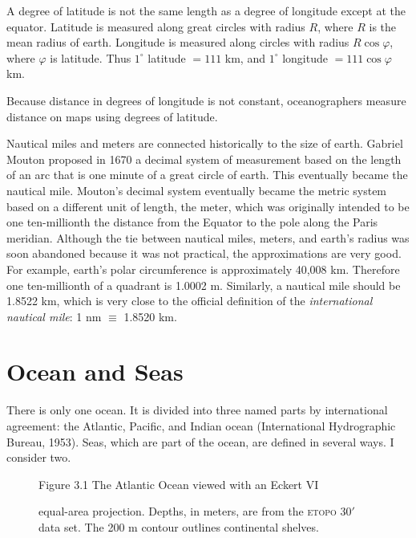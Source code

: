 A degree of latitude is not the same length as a degree of longitude except
at the equator. Latitude is measured along great circles with radius $R$, where
$R$ is the mean radius of earth. Longitude is measured along circles with
radius $R \cos \varphi$, where
$\varphi$ is latitude. Thus $1^{\circ}$ latitude $ = 111$ km, and $1^{\circ}$
longitude $= 111 \cos \varphi$ km.

Because distance in degrees of longitude is not constant, oceanographers measure
distance on maps using degrees of latitude.

Nautical miles and meters are connected historically to the size of earth. Gabriel Mouton proposed in 1670
a decimal system of measurement based on the length of an arc that is one minute of a great circle of
earth.  This eventually became the nautical mile. Mouton's decimal system eventually became the metric
system based on a different unit of length, the meter, which was originally intended to be one
ten-millionth the distance from the Equator to the pole along the Paris meridian. Although the
tie between nautical miles, meters, and earth's radius was soon abandoned because it was not
practical, the approximations are very good. For example, earth's polar circumference
is approximately 40,008 km. Therefore one ten-millionth of a quadrant is 1.0002
m. Similarly, a nautical mile should be 1.8522 km, which is
very close to the official definition of the \textit{international nautical mile}: 1 nm $\equiv$ 1.8520 km.

\section{Ocean and Seas}
There is only one ocean. It is divided into three named parts by international agreement: the Atlantic, Pacific, and Indian ocean (International Hydrographic Bureau,
1953). Seas, which are part of the ocean, are
defined in several ways. I consider two.

\begin{figure}[t!]
 \footnotesize
\centering Figure 3.1 The Atlantic Ocean viewed with an Eckert
VI\rule{0mm}{3ex} equal-area projection. Depths, in meters, are
from the \textsc{etopo} 30$'$ data set. The 200 m contour outlines
continental shelves.

\label{fig:atlantic}
\vspace{-4ex}
\end{figure}

